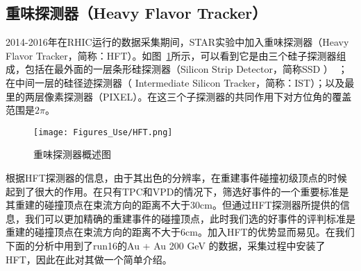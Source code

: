 \subsection{重味探测器（Heavy Flavor Tracker）}
2014-2016年在RHIC运行的数据采集期间，STAR实验中加入重味探测器（Heavy Flavor Tracker，简称：HFT）。如图~\ref{fig:hftPixel}所示，可以看到它是由三个硅子探测器组成，包括在最外面的一层条形硅探测器（Silicon Strip Detector，简称SSD ）~\cite{ARNOLD2003652}；在中间一层的硅径迹探测器（ Intermediate Silicon Tracker，简称：IST）；以及最里的两层像素探测器（PIXEL）\cite{HLTPIXEL,CONTIN201860}。在这三个子探测器的共同作用下对方位角的覆盖范围是$2\pi$。
\begin{figure}[htbp]
\centering
\texttt{[image: Figures\_Use/HFT.png]}
\caption{重味探测器概述图~\cite{Hao_2014}}
\label{fig:hftPixel}
\end{figure}
根据HFT探测器的信息，由于其出色的分辨率，在重建事件碰撞初级顶点的时候起到了很大的作用。在只有TPC和VPD的情况下，筛选好事件的一个重要标准是其重建的碰撞顶点在束流方向的距离不大于30cm。但通过HFT探测器所提供的信息，我们可以更加精确的重建事件的碰撞顶点，此时我们选的好事件的评判标准是重建的碰撞顶点在束流方向的距离不大于6cm。加入HFT的优势显而易见。在我们下面的分析中用到了run16的Au + Au 200 GeV 的数据，采集过程中安装了HFT，因此在此对其做一个简单介绍。



